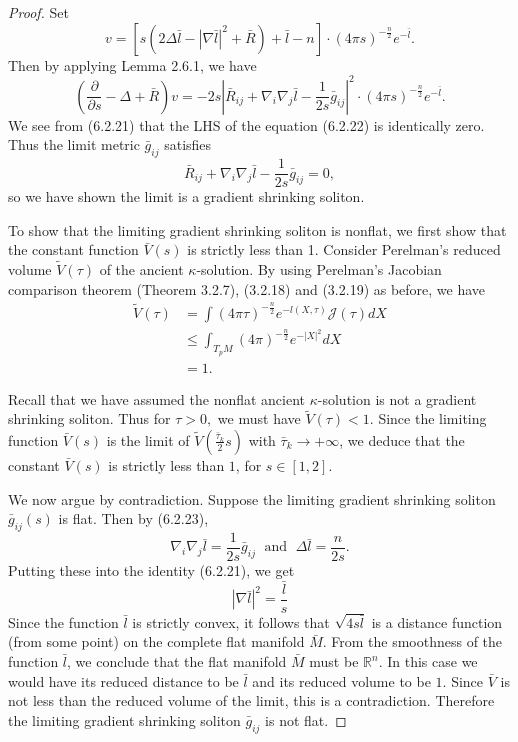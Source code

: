 \begin{proof}
Set
$$
v=[s(2\Delta \bar{l}-|\nabla \bar{l}|^2+\bar{R})+\bar{l}-n]\cdot
(4\pi s)^{-\frac{n}{2}}e^{-\bar{l}}.
$$
Then by applying Lemma 2.6.1, we have \begin{equation}
\left(\frac{\partial}{\partial s}-\Delta+\bar{R}\right)v
=-2s|\bar{R}_{ij}+\nabla_i\nabla_j\bar{l}
-\frac{1}{2s}\bar{g}_{ij}|^2\cdot
(4\pi s)^{-\frac{n}{2}}e^{-\bar{l}}. %
\end{equation} We see from (6.2.21) that the LHS of the equation (6.2.22) is
identically zero. Thus the limit metric $\bar{g}_{ij}$ satisfies
\begin{equation}
\bar{R}_{ij}+\nabla_i\nabla_j\bar{l}-\frac{1}{2s}\bar{g}_{ij}=0,
\end{equation} so we have shown the limit is a gradient shrinking soliton.

To show that the limiting gradient shrinking soliton is nonflat,
we first show that the constant function $\bar{V}(s)$ is strictly
less than 1. Consider Perelman's reduced volume $\tilde{V}(\tau)$
of the ancient $\kappa$-solution. By using Perelman's Jacobian
comparison theorem (Theorem 3.2.7), (3.2.18) and (3.2.19) as
before, we have
\begin{align*}
\tilde{V}(\tau)&  = \int (4\pi
\tau)^{-\frac{n}{2}}e^{-l(X,\tau)}{\mathcal{J}}(\tau)dX \\
&  \leq \int_{T_pM}(4\pi)^{-\frac{n}{2}}e^{-|X|^2}dX \\
&  = 1.
\end{align*}

Recall that we have assumed the nonflat ancient $\kappa$-solution
is not a gradient shrinking soliton. Thus for $\tau>0,$ we must
have $\tilde{V}(\tau)<1$. Since the limiting function $\bar{V}(s)$
is the limit of $\tilde{V}(\frac{\bar{\tau}_k}{2}s)$ with
$\bar{\tau}_k\rightarrow +\infty$, we deduce that the constant
$\bar{V}(s)$ is strictly less than $1$, for $s\in[1,2].$

We now argue by contradiction. Suppose the limiting gradient
shrinking soliton $\bar{g}_{ij}(s)$ is flat. Then by (6.2.23),
$$
\nabla_i\nabla_j\bar{l} =\frac{1}{2s}\bar{g}_{ij} \; \mbox{ and }
\;\Delta\bar{l} =\frac{n}{2s}.
$$
Putting these into the identity (6.2.21), we get
$$
|\nabla\bar{l}|^2=\frac{\bar{l}}{s}
$$
Since the function $\bar{l}$ is strictly convex, it follows that
$\sqrt{4s\bar{l}}$ is a distance function (from some point) on the
complete flat manifold $\bar{M}$. From the smoothness of the
function $\bar{l}$, we conclude that the flat manifold $\bar{M}$
must be $\mathbb{R}^n$. In this case we would have its reduced
distance to be $\bar{l}$ and its reduced volume to be $1$. Since
$\bar{V}$ is not less than the reduced volume of the limit, this
is a contradiction. Therefore the limiting gradient shrinking
soliton $\bar{g}_{ij}$ is not flat.
\end{proof}

